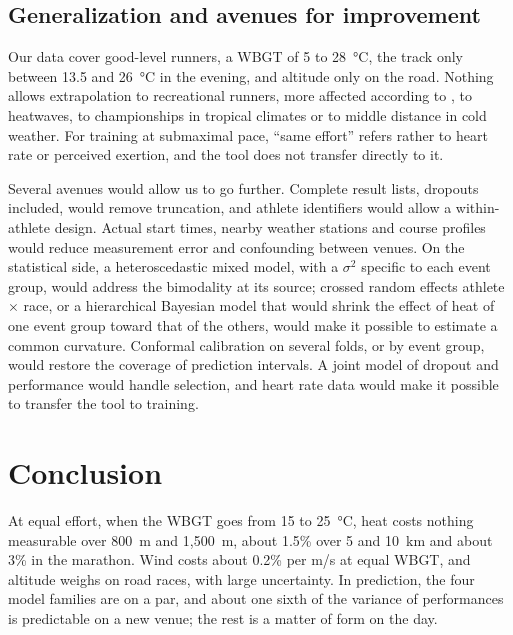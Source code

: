 \documentclass[11pt,a4paper]{article}
\begin{document}
\subsection{Generalization and avenues for improvement}\label{sec:generalization}

Our data cover good-level runners, a WBGT of 5 to 28~°C, the track only between 13.5 and 26~°C in the evening, and
altitude only on the road. Nothing allows extrapolation to recreational runners, more affected according to
\citet{ely2007}, to heatwaves, to championships in tropical climates or to middle distance in cold weather. For training
at submaximal pace, ``same effort'' refers rather to heart rate or perceived exertion, and the tool does not transfer
directly to it.

Several avenues would allow us to go further. Complete result lists, dropouts included, would remove truncation, and
athlete identifiers would allow a within-athlete design. Actual start times, nearby weather stations and course
profiles would reduce measurement error and confounding between venues. On the statistical side, a heteroscedastic
mixed model, with a $\sigma^2$ specific to each event group, would address the bimodality at its source; crossed random
effects athlete $\times$ race, or a hierarchical Bayesian model that would shrink the effect of heat of one event group
toward that of the others, would make it possible to estimate a common curvature. Conformal calibration on several
folds, or by event group, would restore the coverage of prediction intervals. A joint model of dropout and performance
would handle selection, and heart rate data would make it possible to transfer the tool to training.

\section{Conclusion}\label{sec:conclusion}

At equal effort, when the WBGT goes from 15 to 25~°C, heat costs nothing measurable over 800~m and 1,500~m, about 1.5\%
over 5 and 10~km and about 3\% in the marathon. Wind costs about 0.2\% per m/s at equal WBGT, and altitude weighs on
road races, with large uncertainty. In prediction, the four model families are on a par, and about one sixth of the
variance of performances is predictable on a new venue; the rest is a matter of form on the day.
\end{document}
